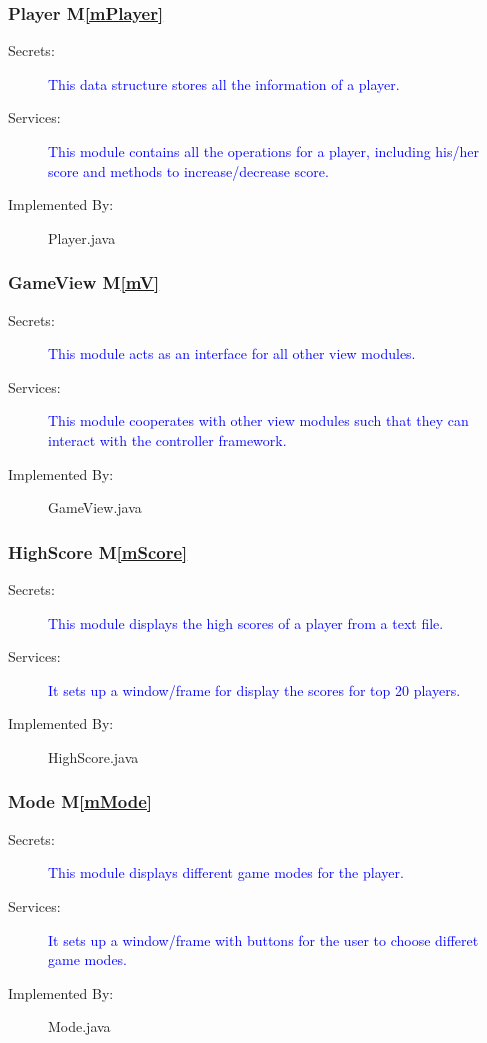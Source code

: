 \documentclass[12pt,letterpaper]{article}
\begin{document}
	\subsubsection{Player M\ref{mPlayer}}
\begin{description} 
	\item[Secrets: ] \textcolor{blue}{This data structure stores all the information of a player.}
	\item[Services: ] \textcolor{blue} {This module contains all the operations for a player, including his/her score and methods to increase/decrease score.}
	\item[Implemented By: ] Player.java
\end{description}
	\subsubsection{GameView M\ref{mV}}
\begin{description} 
	\item[Secrets: ] \textcolor{blue}{This module acts as an interface for all other view modules.}
	\item[Services: ] \textcolor{blue} {This module cooperates with other view modules such that they can interact with the controller framework.}
	\item[Implemented By: ] GameView.java
\end{description}	
	\subsubsection{HighScore M\ref{mScore}}
\begin{description} 
	\item[Secrets: ] \textcolor{blue}{This module displays the high scores of a player from a text file.}
	\item[Services: ] \textcolor{blue} {It sets up a window/frame for display the scores for top 20 players.}
	\item[Implemented By: ] HighScore.java
\end{description}
	\subsubsection{Mode M\ref{mMode}}
\begin{description} 
	\item[Secrets: ] \textcolor{blue}{This module displays different game modes for the player.}
	\item[Services: ] \textcolor{blue} {It sets up a window/frame with buttons for the user to choose differet game modes.}
	\item[Implemented By: ] Mode.java
\end{description}
\end{document}
